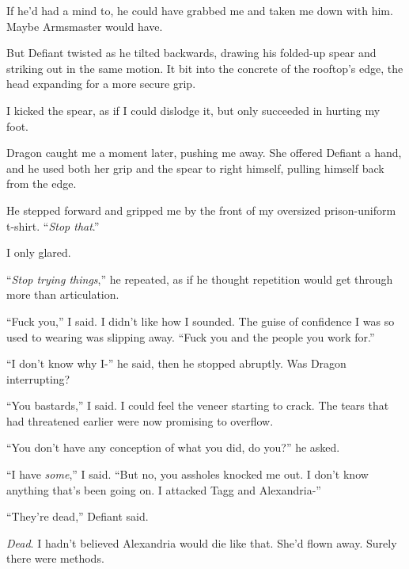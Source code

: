 If he'd had a mind to, he could have grabbed me and taken me down with him.  Maybe Armsmaster would have.



But Defiant twisted as he tilted backwards, drawing his folded-up spear and striking out in the same motion.  It bit into the concrete of the rooftop's edge, the head expanding for a more secure grip.



I kicked the spear, as if I could dislodge it, but only succeeded in hurting my foot.



Dragon caught me a moment later, pushing me away.  She offered Defiant a hand, and he used both her grip and the spear to right himself, pulling himself back from the edge.



He stepped forward and gripped me by the front of my oversized prison-uniform t-shirt.  ``\emph{Stop that}.''



I only glared.



``\emph{Stop trying things},'' he repeated, as if he thought repetition would get through more than articulation.



``Fuck you,'' I said.  I didn't like how I sounded.  The guise of confidence I was so used to wearing was slipping away.  ``Fuck you and the people you work for.''



``I don't know why I-'' he said, then he stopped abruptly.  Was Dragon interrupting?



``You bastards,'' I said.  I could feel the veneer starting to crack.  The tears that had threatened earlier were now promising to overflow.



``You don't have any conception of what you did, do you?'' he asked.



``I have \emph{some},'' I said.  ``But no, you assholes knocked me out.  I don't know anything that's been going on.  I attacked Tagg and Alexandria-''



``They're dead,'' Defiant said.



\emph{Dead}.  I hadn't believed Alexandria would die like that.  She'd flown away.  Surely there were methods.



